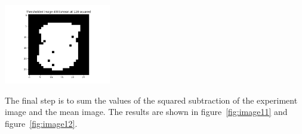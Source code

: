 \begin{center}
\includegraphics[width=0.35\textwidth]{image12.png}
\end{center}

The final step is to sum the values of the squared subtraction of the experiment image and the mean image. The results are shown in figure~\ref{fig:image11} and figure~\ref{fig:image12}.
